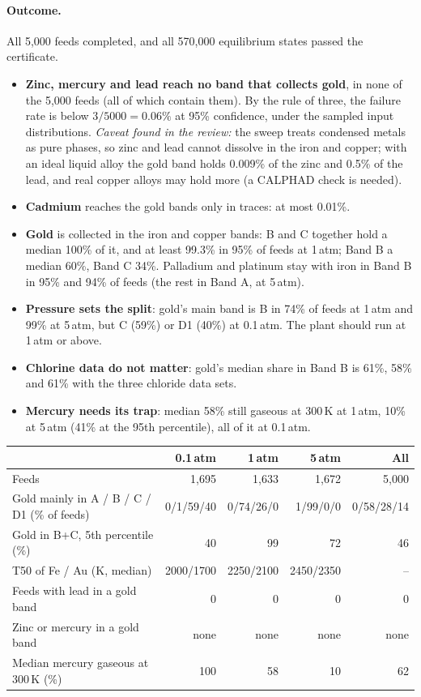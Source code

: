 \documentclass[11pt,a4paper]{article}
\begin{document}
\paragraph{Outcome.} All 5,000 feeds completed, and all 570,000 equilibrium states passed the certificate.
\begin{itemize}
\item \textbf{Zinc, mercury and lead reach no band that collects gold}, in none of the 5,000 feeds (all of which contain them). By the rule of three, the failure rate is below $3/5000 = 0.06\%$ at 95\% confidence, under the sampled input distributions. \emph{Caveat found in the review:} the sweep treats condensed metals as pure phases, so zinc and lead cannot dissolve in the iron and copper; with an ideal liquid alloy the gold band holds 0.009\% of the zinc and 0.5\% of the lead, and real copper alloys may hold more (a CALPHAD check is needed).
\item \textbf{Cadmium} reaches the gold bands only in traces: at most 0.01\%.
\item \textbf{Gold} is collected in the iron and copper bands: B and C together hold a median 100\% of it, and at least 99.3\% in 95\% of feeds at 1\,atm; Band B a median 60\%, Band C 34\%. Palladium and platinum stay with iron in Band B in 95\% and 94\% of feeds (the rest in Band A, at 5\,atm).
\item \textbf{Pressure sets the split}: gold's main band is B in 74\% of feeds at 1\,atm and 99\% at 5\,atm, but C (59\%) or D1 (40\%) at 0.1\,atm. The plant should run at 1\,atm or above.
\item \textbf{Chlorine data do not matter}: gold's median share in Band B is 61\%, 58\% and 61\% with the three chloride data sets.
\item \textbf{Mercury needs its trap}: median 58\% still gaseous at 300\,K at 1\,atm, 10\% at 5\,atm (41\% at the 95th percentile), all of it at 0.1\,atm.
\end{itemize}

\begin{center}
\small
\begin{tabular}{@{}>{\raggedright\arraybackslash}p{5.4cm}rrrr@{}}
\toprule
& \textbf{0.1\,atm} & \textbf{1\,atm} & \textbf{5\,atm} & \textbf{All} \\
\midrule
Feeds & 1,695 & 1,633 & 1,672 & 5,000 \\
Gold mainly in A / B / C / D1 (\% of feeds) & 0/1/59/40 & 0/74/26/0 & 1/99/0/0 & 0/58/28/14 \\
Gold in B+C, 5th percentile (\%) & 40 & 99 & 72 & 46 \\
T50 of Fe / Au (K, median) & 2000/1700 & 2250/2100 & 2450/2350 & -- \\
Feeds with lead in a gold band & 0 & 0 & 0 & 0 \\
Zinc or mercury in a gold band & none & none & none & none \\
Median mercury gaseous at 300\,K (\%) & 100 & 58 & 10 & 62 \\
\bottomrule
\end{tabular}
\end{center}
\end{document}

